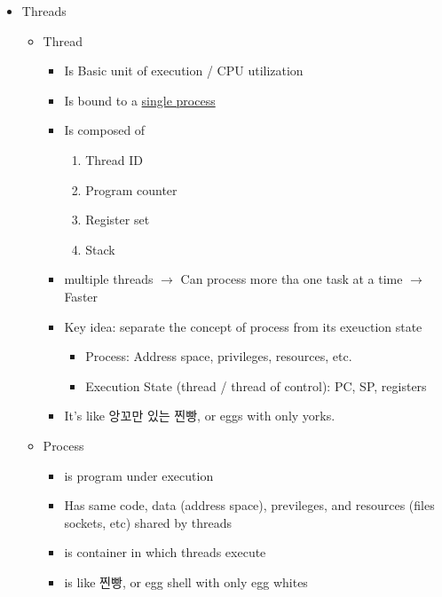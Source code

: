 \documentclass[12pt]{article}
\begin{document}
\begin{itemize}
\begin{itemize}
\begin{enumerate}[1.]
\begin{itemize}
            \end{itemize}
        \end{enumerate}

    \end{itemize}
    \item Threads
    \begin{itemize}
        \item Thread
        \begin{itemize}
            \item Is Basic unit of execution / CPU utilization
            \item Is bound to a \underline{single process}
            \item Is composed of
            \begin{enumerate}[1.]
                \item Thread ID
                \item Program counter
                \item Register set
                \item Stack
            \end{enumerate}
            \item multiple threads $\to$ Can process more tha one task at a time $\to$ Faster
            \item Key idea: separate the concept of process from its exeuction state

            \begin{itemize}
                \item Process: Address space, privileges, resources, etc.
                \item Execution State (thread / thread of control): PC, SP, registers
            \end{itemize}
            \item It's like 앙꼬만 있는 찐빵, or eggs with only yorks.
        \end{itemize}
        \item Process
        \begin{itemize}
            \item is program under execution
            \item Has same code, data (address space), previleges, and resources
            (files sockets, etc) shared by threads
            \item is container in which threads execute
            \item is like 찐빵, or egg shell with only egg whites
        \end{itemize}


\end{itemize}
\end{itemize}
\end{document}
